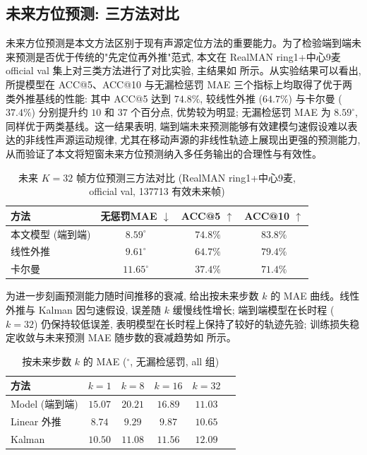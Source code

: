 \documentclass[lang=cn,a4paper,newtx]{elegantpaper}
\begin{document}
\subsection{未来方位预测: 三方法对比}

未来方位预测是本文方法区别于现有声源定位方法的重要能力。为了检验端到端未来预测是否优于传统的"先定位再外推"范式, 本文在 RealMAN ring1+中心9麦 official val 集上对三类方法进行了对比实验, 主结果如 所示。从实验结果可以看出, 所提模型在 ACC@5、ACC@10 与无漏检惩罚 MAE 三个指标上均取得了优于两类外推基线的性能: 其中 ACC@5 达到 $74.8\%$, 较线性外推 ($64.7\%$) 与卡尔曼 ($37.4\%$) 分别提升约 $10$ 和 $37$ 个百分点, 优势较为明显; 无漏检惩罚 MAE 为 $8.59^\circ$, 同样优于两类基线。这一结果表明, 端到端未来预测能够有效建模匀速假设难以表达的非线性声源运动规律, 尤其在移动声源的非线性轨迹上展现出更强的预测能力, 从而验证了本文将短窗未来方位预测纳入多任务输出的合理性与有效性。

\begin{table}[!htb]
  \centering
  \caption{未来 $K{=}32$ 帧方位预测三方法对比 (RealMAN ring1+中心9麦, official val, 137713 有效未来帧)}
  \label{tab:future}
  \begin{tabular}{lccc}
    \toprule
    方法 & 无惩罚MAE $\downarrow$ & ACC@5 $\uparrow$ & ACC@10 $\uparrow$ \\
    \midrule
    本文模型 (端到端) & $\mathbf{8.59^\circ}$ & $\mathbf{74.8\%}$ & $\mathbf{83.8\%}$ \\
    线性外推          & $9.61^\circ$ & $64.7\%$ & $79.4\%$ \\
    卡尔曼            & $11.65^\circ$ & $37.4\%$ & $71.4\%$ \\
    \bottomrule
  \end{tabular}
\end{table}

为进一步刻画预测能力随时间推移的衰减,  给出按未来步数 $k$ 的 MAE 曲线。线性外推与 Kalman 因匀速假设, 误差随 $k$ 缓慢线性增长; 端到端模型在长时程 ($k{=}32$) 仍保持较低误差, 表明模型在长时程上保持了较好的轨迹先验; 训练损失稳定收敛与未来预测 MAE 随步数的衰减趋势如 所示。

\begin{table}[!htb]
  \centering
  \caption{按未来步数 $k$ 的 MAE ($^\circ$, 无漏检惩罚, all 组)}
  \label{tab:k_mae}
  \begin{tabular}{lccccc}
    \toprule
    方法 & $k{=}1$ & $k{=}8$ & $k{=}16$ & $k{=}32$ \\
    \midrule
    Model (端到端) & $15.07$ & $20.21$ & $16.89$ & $11.03$ \\
    Linear 外推 & $8.74$ & $9.29$ & $9.87$ & $10.65$ \\
    Kalman & $10.50$ & $11.08$ & $11.56$ & $12.09$ \\
    \bottomrule
  \end{tabular}
\end{table}
\end{document}
